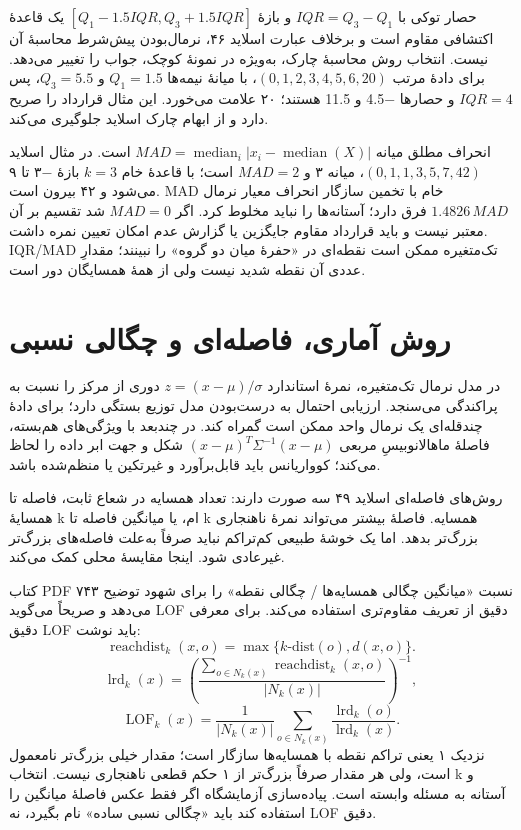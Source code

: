حصار توکی با \(IQR=Q_3-Q_1\) و بازهٔ \([Q_1-1.5IQR,Q_3+1.5IQR]\) یک قاعدهٔ اکتشافی مقاوم است و برخلاف عبارت اسلاید ۴۶، نرمال‌بودن پیش‌شرط محاسبهٔ آن نیست. انتخاب روش محاسبهٔ چارک، به‌ویژه در نمونهٔ کوچک، جواب را تغییر می‌دهد. برای دادهٔ مرتب \((0,1,2,3,4,5,6,20)\)، با میانهٔ نیمه‌ها $Q_1=1.5$ و $Q_3=5.5$، پس $IQR=4$ و حصارها −4.5 و 11.5 هستند؛ ۲۰ علامت می‌خورد. این مثال قرارداد را صریح دارد و از ابهام چارک اسلاید جلوگیری می‌کند.

انحراف مطلق میانه \(MAD=\operatorname{median}_i|x_i-\operatorname{median}(X)|\) است. در مثال اسلاید \((0,1,1,3,5,7,42)\)، میانه ۳ و $MAD=2$ است؛ با قاعدهٔ خام $k=3$ بازهٔ −۳ تا ۹ می‌شود و ۴۲ بیرون است. MAD خام با تخمین سازگار انحراف معیار نرمال \(1.4826\,MAD\) فرق دارد؛ آستانه‌ها را نباید مخلوط کرد. اگر $MAD=0$ شد تقسیم بر آن معتبر نیست و باید قرارداد مقاوم جایگزین یا گزارش عدم امکان تعیین نمره داشت. IQR/MAD تک‌متغیره ممکن است نقطه‌ای در «حفرهٔ میان دو گروه» را نبینند؛ مقدارِ عددی آن نقطه شدید نیست ولی از همهٔ همسایگان دور است.

\section{روش آماری، فاصله‌ای و چگالی نسبی}

در مدل نرمال تک‌متغیره، نمرهٔ استاندارد \(z=(x-\mu)/\sigma\) دوری از مرکز را نسبت به پراکندگی می‌سنجد. ارزیابی احتمال به درست‌بودن مدل توزیع بستگی دارد؛ برای دادهٔ چندقله‌ای یک نرمال واحد ممکن است گمراه کند. در چندبعد با ویژگی‌های هم‌بسته، فاصلهٔ ماهالانوبیسِ مربعی \((x-\mu)^T\Sigma^{-1}(x-\mu)\) شکل و جهت ابر داده را لحاظ می‌کند؛ کوواریانس باید قابل‌برآورد و غیرتکین یا منظم‌شده باشد.

روش‌های فاصله‌ای اسلاید ۴۹ سه صورت دارند: تعداد همسایه در شعاع ثابت، فاصله تا همسایهٔ k ام، یا میانگین فاصله تا k همسایه. فاصلهٔ بیشتر می‌تواند نمرهٔ ناهنجاری بزرگ‌تر بدهد. اما یک خوشهٔ طبیعی کم‌تراکم نباید صرفاً به‌علت فاصله‌های بزرگ‌تر غیرعادی شود. اینجا مقایسهٔ محلی کمک می‌کند.

کتاب PDF ۷۴۳ نسبت «میانگین چگالی همسایه‌ها / چگالی نقطه» را برای شهود توضیح می‌دهد و صریحاً می‌گوید LOF دقیق از تعریف مقاوم‌تری استفاده می‌کند. برای معرفی دقیق LOF باید نوشت: \[
\operatorname{reachdist}_k(x,o)=\max\{k\text{-dist}(o),d(x,o)\}.
\] \[
\operatorname{lrd}_k(x)=\left(\frac{\sum_{o\in N_k(x)}\operatorname{reachdist}_k(x,o)}{|N_k(x)|}\right)^{-1},
\] \[
\operatorname{LOF}_k(x)=\frac{1}{|N_k(x)|}\sum_{o\in N_k(x)}\frac{\operatorname{lrd}_k(o)}{\operatorname{lrd}_k(x)}.
\] نزدیک ۱ یعنی تراکم نقطه با همسایه‌ها سازگار است؛ مقدار خیلی بزرگ‌تر نامعمول است، ولی هر مقدار صرفاً بزرگ‌تر از ۱ حکم قطعی ناهنجاری نیست. انتخاب k و آستانه به مسئله وابسته است. پیاده‌سازی آزمایشگاه اگر فقط عکس فاصلهٔ میانگین را استفاده کند باید «چگالی نسبی ساده» نام بگیرد، نه LOF دقیق.

